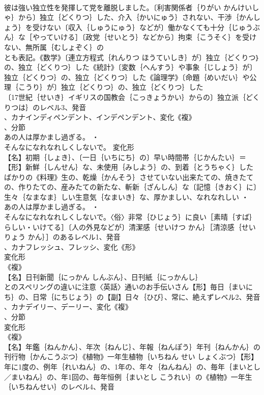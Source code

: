 \documentclass[8pt]{extreport}
\begin{document}
\begin{CJK}{UTF8}{min}
\\	彼は強い独立性を発揮して党を離脱しました。〔利害関係者｛りがい かんけいしゃ｝から〕独立｛どくりつ｝した、介入｛かいにゅう｝されない、干渉｛かんしょう｝を受けない〔収入｛しゅうにゅう｝などが〕働かなくても十分｛じゅうぶん｝な［やっていける］〔政党｛せいとう｝などから〕拘束｛こうそく｝を受けない、無所属｛むしょぞく｝の
\\	とも表記。《数学》〔連立方程式｛れんりつ ほうていしき｝が〕独立｛どくりつ｝の、独立｛どくりつ｝した《統計》〔変数｛へんすう｝や事象｛じしょう｝が〕独立｛どくりつ｝の、独立｛どくりつ｝した《論理学》〔命題｛めいだい｝や公理｛こうり｝が〕独立｛どくりつ｝の、独立｛どくりつ｝した
\\	〔17世紀｛せいき｝イギリスの国教会｛こっきょうかい｝からの〕独立派｛どくりつは｝のレベル3、発音
\\	、カナインディペンデント、インデペンデント、変化《複》
\\	、分節
\\	あの人は厚かまし過ぎる。 ・
\\	そんなになれなれしくしないで。	変化形 
\\	【名】初期｛しょき｝、〔一日｛いちにち｝の〕早い時間帯｛じかんたい｝＝ 
\\	【形】新鮮｛しんせん｝な、未使用｛みしよう｝の、到着｛とうちゃく｝したばかりの《料理》生の、乾燥｛かんそう｝させていない出来たての、焼きたての、作りたての、産みたての新たな、斬新｛ざんしん｝な〔記憶｛きおく｝に〕生々｛なまなま｝しい生意気｛なまいき｝な、厚かましい、なれなれしい ・
\\	あの人は厚かまし過ぎる。 ・
\\	そんなになれなれしくしないで。〈俗〉非常｛ひじょう｝に良い［素晴｛すば｝らしい・いけてる］〔人の外見などが〕清潔感｛せいけつ かん｝［清涼感｛せいりょう かん｝］のあるレベル1、発音
\\	、カナフレッシュ、フレッシ、変化《形》
\\	変化形 
\\	《複》
\\	【名】日刊新聞｛にっかん しんぶん｝、日刊紙｛にっかんし｝
\\	とのスペリングの違いに注意〈英話〉通いのお手伝いさん【形】毎日｛まいにち｝の、日常｛にちじょう｝の【副】日々｛ひび｝、常に、絶えずレベル2、発音
\\	、カナデイリー、デーリー、変化《複》
\\	、分節
\\	変化形 
\\	《複》
\\	【名】年鑑｛ねんかん｝、年次｛ねんじ｝、年報｛ねんぽう｝年刊｛ねんかん｝の刊行物｛かんこうぶつ｝《植物》一年生植物｛いちねん せい しょくぶつ｝【形】年に1度の、例年｛れいねん｝の、1年の、年々｛ねんねん｝の、毎年｛まいとし／まいねん｝の、年1回の、毎年恒例｛まいとし こうれい｝の《植物》一年生｛いちねんせい｝のレベル4、発音

\end{CJK}
\end{document}

